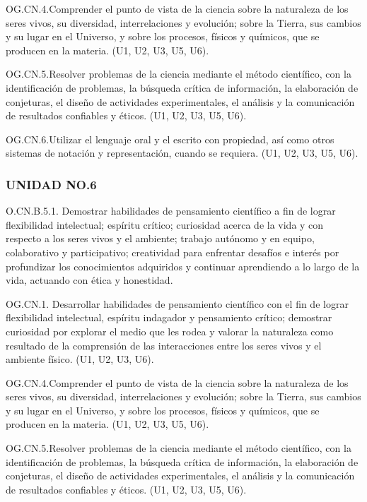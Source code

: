 \documentclass[a4paper, 12pt]{article}
\begin{document}
OG.CN.4.Comprender el punto de vista de la ciencia sobre la naturaleza de los seres vivos, su diversidad, interrelaciones y evolución; sobre la Tierra, sus cambios y su lugar en el Universo, y sobre los procesos, físicos y químicos, que se producen en la materia. (U1, U2, U3, U5, U6).

OG.CN.5.Resolver problemas de la ciencia mediante el método científico, con la identificación de problemas, la búsqueda crítica de información, la elaboración de conjeturas, el diseño de actividades experimentales, el análisis y la comunicación de resultados confiables y éticos. (U1, U2, U3, U5, U6).

OG.CN.6.Utilizar el lenguaje oral y el escrito con propiedad, así como otros sistemas de notación y representación, cuando se requiera. (U1, U2, U3, U5, U6).


\subsubsection{UNIDAD NO.6}

O.CN.B.5.1. Demostrar habilidades de pensamiento científico a fin de lograr flexibilidad intelectual; espíritu crítico; curiosidad acerca de la vida y con respecto a los seres vivos y el ambiente; trabajo autónomo y en equipo, colaborativo y participativo; creatividad para enfrentar desafíos e interés por profundizar los conocimientos adquiridos y continuar aprendiendo a lo largo de la vida, actuando con ética y honestidad.

OG.CN.1. Desarrollar habilidades de pensamiento científico con el fin de lograr flexibilidad intelectual, espíritu indagador y pensamiento crítico; demostrar curiosidad por explorar el medio que les rodea y valorar la naturaleza como resultado de la comprensión de las interacciones entre los seres vivos y el ambiente físico. (U1, U2, U3, U6).

OG.CN.4.Comprender el punto de vista de la ciencia sobre la naturaleza de los seres vivos, su diversidad, interrelaciones y evolución; sobre la Tierra, sus cambios y su lugar en el Universo, y sobre los procesos, físicos y químicos, que se producen en la materia. (U1, U2, U3, U5, U6).

OG.CN.5.Resolver problemas de la ciencia mediante el método científico, con la identificación de problemas, la búsqueda crítica de información, la elaboración de conjeturas, el diseño de actividades experimentales, el análisis y la comunicación de resultados confiables y éticos. (U1, U2, U3, U5, U6).
\end{document}
